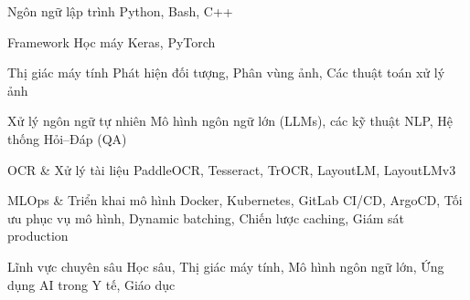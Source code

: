 
\begin{cvskills}

  \cvskill
    {Ngôn ngữ lập trình}
    {Python, Bash, C++}

  \cvskill
    {Framework Học máy}
    {Keras, PyTorch}

  \cvskill
    {Thị giác máy tính}
    {Phát hiện đối tượng, Phân vùng ảnh, Các thuật toán xử lý ảnh}

  \cvskill
    {Xử lý ngôn ngữ tự nhiên}
    {Mô hình ngôn ngữ lớn (LLMs), các kỹ thuật NLP, Hệ thống Hỏi--Đáp (QA)}

  \cvskill
    {OCR \& Xử lý tài liệu}
    {PaddleOCR, Tesseract, TrOCR, LayoutLM, LayoutLMv3}

  \cvskill
    {MLOps \& Triển khai mô hình}
    {Docker, Kubernetes, GitLab CI/CD, ArgoCD, Tối ưu phục vụ mô hình, Dynamic batching, Chiến lược caching, Giám sát production}

  \cvskill
    {Lĩnh vực chuyên sâu}
    {Học sâu, Thị giác máy tính, Mô hình ngôn ngữ lớn, Ứng dụng AI trong Y tế, Giáo dục}

\end{cvskills}

